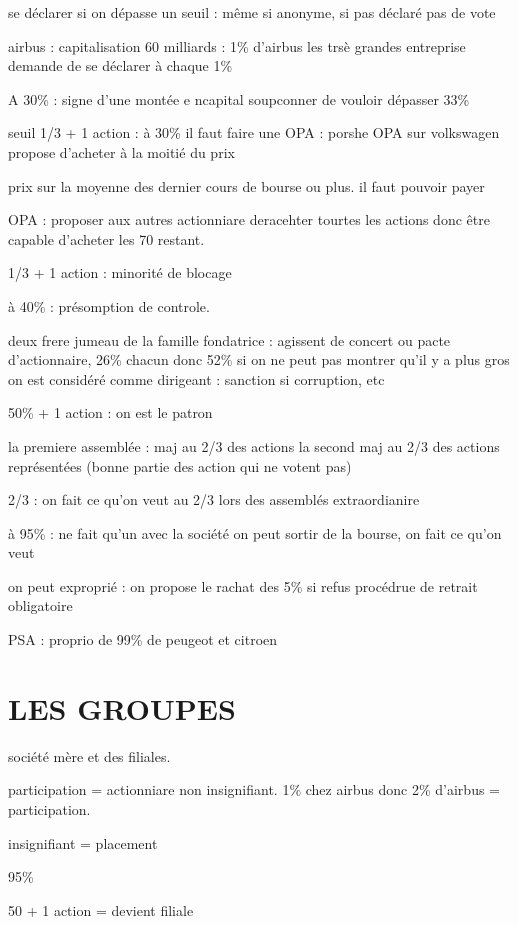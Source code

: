 \documentclass[a4paper,12pt]{article}
\begin{document}
se déclarer si on dépasse un seuil : même si anonyme, si pas déclaré pas de vote

airbus : capitalisation 60 milliards : 1\% d'airbus
les trsè grandes entreprise demande de se déclarer à chaque 1\% 


A 30\% : signe d'une montée e ncapital
soupconner de vouloir dépasser 33\%

seuil 1/3 + 1 action : 
à 30\% il faut faire une OPA  :  porshe OPA sur volkswagen propose d'acheter à la moitié du prix

prix sur la moyenne des dernier cours de bourse ou plus. il faut pouvoir payer
 
OPA : proposer aux autres actionniare deracehter tourtes les actions donc être
capable d'acheter les 70 restant.

1/3 + 1 action : minorité de blocage

à 40\% : présomption de controle.

deux frere jumeau de la famille fondatrice : agissent de concert ou pacte d'actionnaire, 26\% chacun donc 52\%
si on ne peut pas montrer qu'il y a plus gros on est considéré comme dirigeant : sanction si corruption, etc

50\% + 1 action : on est le patron

la premiere assemblée :  maj au 2/3 des actions
la second maj au 2/3 des actions représentées (bonne partie des action qui ne votent pas)


2/3 : on fait ce qu'on veut au 2/3 lors des assemblés extraordianire

à 95\% : ne fait qu'un avec la société
on peut sortir de la bourse, on fait ce qu'on veut

on peut exproprié : on propose le rachat des 5\% si refus
procédrue de retrait obligatoire

PSA : proprio de 99\% de peugeot et citroen




\section{LES GROUPES}

société mère et des filiales.

participation = actionniare non insignifiant.  1\% chez airbus
donc 2\% d'airbus = participation. 

insignifiant = placement

95\%

50 + 1 action = devient filiale
\end{document}
